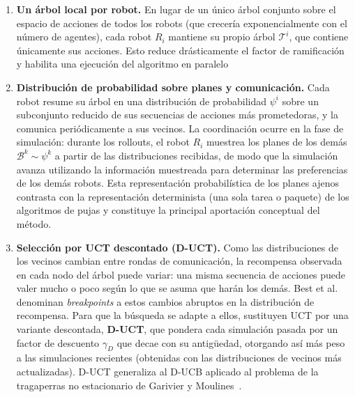 \begin{enumerate}
    \item \textbf{Un árbol local por robot.} En lugar de un único árbol conjunto sobre el espacio de acciones de todos los robots (que crecería exponencialmente con el número de agentes), cada robot $R_i$ mantiene su propio árbol $\mathcal{T}^{i}$, que contiene únicamente sus acciones. Esto reduce drásticamente el factor de ramificación y habilita una ejecución del algoritmo en paralelo

    \item \textbf{Distribución de probabilidad sobre planes y comunicación.} Cada robot resume su árbol en una distribución de probabilidad $\psi^{i}$ sobre un subconjunto reducido de sus secuencias de acciones más prometedoras, y la comunica periódicamente a sus vecinos. La coordinación ocurre en la fase de simulación: durante los rollouts, el robot $R_i$ muestrea los planes de los demás $\mathcal{B}^{k} \sim \psi^{k}$ a partir de las distribuciones recibidas, de modo que la simulación avanza utilizando la información muestreada para determinar las preferencias de los demás robots. Esta representación probabilística de los planes ajenos contrasta con la representación determinista (una sola tarea o paquete) de los algoritmos de pujas y constituye la principal aportación conceptual del método.

    \item \textbf{Selección por UCT descontado (D-UCT).} Como las distribuciones de los vecinos cambian entre rondas de comunicación, la recompensa observada en cada nodo del árbol puede variar: una misma secuencia de acciones puede valer mucho o poco según lo que se asuma que harán los demás. Best et al. denominan \emph{breakpoints} a estos cambios abruptos en la distribución de recompensa. Para que la búsqueda se adapte a ellos, sustituyen UCT por una variante descontada, \textbf{D-UCT}, que pondera cada simulación pasada por un factor de descuento $\gamma_D$ que decae con su antigüedad, otorgando así más peso a las simulaciones recientes (obtenidas con las distribuciones de vecinos más actualizadas). D-UCT generaliza al D-UCB aplicado al problema de la tragaperras no estacionario de Garivier y Moulines~\cite{garivier2011ducb}.


\end{enumerate}
